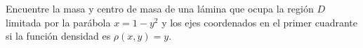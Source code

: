 \item Encuentre la masa y centro de masa de una lámina que ocupa la región $D$ limitada por la parábola $x = 1 - y^2$ y los ejes coordenados en el primer cuadrante si la función densidad es $\rho(x, y) = y$.
